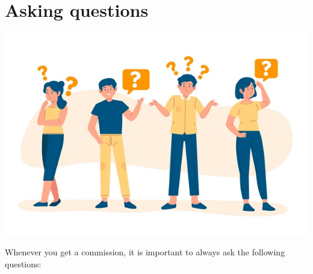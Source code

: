 \documentclass[
]{article}
\begin{document}
\hypertarget{asking-questions}{%
\section{Asking questions}\label{asking-questions}}

\includegraphics{pictures/questions_pic.jpg}

Whenever you get a commission, it is important to always ask the following questions:
\end{document}
